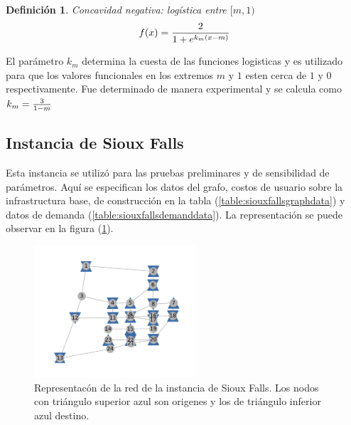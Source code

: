 \documentclass{article}
\newtheorem{definition}{Definición}
\begin{document}
  \begin{definition}
    Concavidad negativa: logística entre $[m, 1)$
    \begin{align}
        f(x) = {2 \over 1 + e^{k_m(x - m)}}
    \end{align}
  \end{definition}

  El parámetro $k_m$ determina la cuesta de las funciones logisticas y es utilizado para que los valores funcionales en los extremos $m$ y $1$ esten cerca de $1$ y $0$ respectivamente. Fue determinado de manera experimental y se calcula como $k_m = {3 \over 1 - m}$

  \subsection*{Instancia de Sioux Falls}

  Esta instancia se utilizó para las pruebas preliminares y de sensibilidad de parámetros. Aquí se especifican los datos del grafo, costos de usuario sobre la infrastructura base, de construcción en la tabla (\ref{table:siouxfallsgraphdata}) y datos de demanda (\ref{table:siouxfallsdemanddata}). La representación se puede observar en la figura (\ref{fig:siouxfallsapendix}).

  \begin{figure}[h!]
    \centering
    \includegraphics[width=6cm]{../resources/sioux_falls_odpairs.png}
    \caption{Representacón de la red de la instancia de Sioux Falls. Los nodos con triángulo superior azul son origenes y los de triángulo inferior azul destino.}
    \label{fig:siouxfallsapendix}
  \end{figure}
\end{document}
